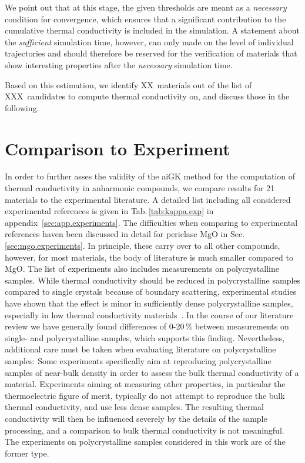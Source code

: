 %
We point out that at this stage, the given thresholds are meant as a \emph{necessary} condition for convergence, which ensures that a significant contribution to the cumulative thermal conductivity is included in the simulation. A statement about the \emph{sufficient} simulation time, however, can only made on the level of individual trajectories and should therefore be reserved for the verification of materials that show interesting properties after the \emph{necessary} simulation time.

Based on this estimation, we identify XX~materials out of the list of XXX~candidates to compute thermal conductivity on, and discuss those in the following.



\section{Comparison to Experiment}
In order to further asses the validity of the aiGK method for the computation of thermal conductivity in anharmonic compounds, we compare results for 21 materials to the experimental literature. A detailed list including all considered experimental references is given in Tab.\,\ref{tab:kappa.exp} in appendix~\ref{sec:app.experiments}. The difficulties when comparing to experimental references haven been discussed in detail for periclase MgO in Sec.\,\ref{sec:mgo.experiments}. In principle, these carry over to all other compounds, however, for most materials, the body of literature is much smaller compared to MgO. The list of experiments also includes measurements on polycrystalline samples. While thermal conductivity should be reduced in polycrystalline samples compared to single crystals because of boundary scattering, experimental studies have shown that the effect is minor in sufficiently dense polycrystalline samples, especially in low thermal conductivity materials~\cite{charvat1957}. In the course of our literature review we have generally found differences of 0-20\,\% between measurements on single- and polycrystalline samples, which supports this finding. Nevertheless, additional care must be taken when evaluating literature on polycrystalline samples: Some experiments specifically aim at reproducing polycrystalline samples of near-bulk density in order to assess the bulk thermal conductivity of a material. Experiments aiming at measuring other properties, in particular the thermoelectric figure of merit, typically do not attempt to reproduce the bulk thermal conductivity, and use less dense samples. The resulting thermal conductivity will then be influenced severely by the details of the sample processing, and a comparison to bulk thermal conductivity is not meaningful. The experiments on polycrystalline samples considered in this work are of the former type.

